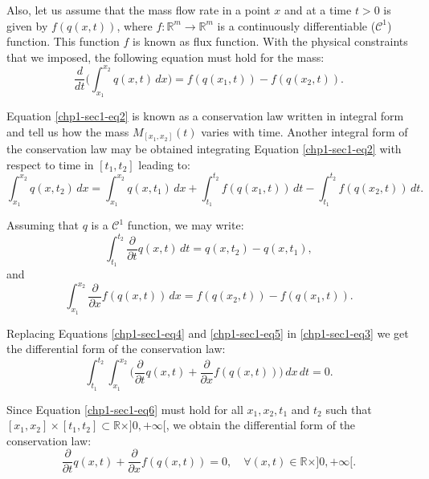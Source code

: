 Also, let us assume that the mass flow rate in a point $x$ and at a time 
$t > 0$ is given by ${f}({q}(x,t))$, where ${f}:\mathbb{R}^m \to \mathbb{R}^m$ is 
a continuously differentiable ($\mathcal{C}^1$) function. This function ${f}$ is known as flux function.
With the physical constraints that we imposed, the following equation must hold for the mass:
\begin{equation}
	\label{chp1-sec1-eq2}
	\frac{d}{dt} \bigg( \int_{x_1}^{x_2} {q}(x,t) \,dx \bigg) = 
	{f}({q}(x_1,t)) - {f}({q}(x_2,t)) .
\end{equation}

Equation \eqref{chp1-sec1-eq2} is known as a conservation law written in integral form and tell us how the mass 
${M}_{[x_1, x_2]}(t)$ varies with time. Another integral form of the conservation law may be obtained integrating
Equation \eqref{chp1-sec1-eq2} with respect to time in $[t_1, t_2]$ leading to: 
\begin{equation}
	\label{chp1-sec1-eq3}
	\int_{x_1}^{x_2} {q}(x, t_2) \,dx = 
	\int_{x_1}^{x_2} {q}(x, t_1) \,dx + 
	\int_{t_1}^{t_2} {f}({q}(x_1, t)) \,dt -
	\int_{t_1}^{t_2}{f}({q}(x_2, t)) \,dt .
\end{equation}

Assuming that ${q}$ is a $\mathcal{C}^1$ function, we may write:
\begin{equation}
	\label{chp1-sec1-eq4}
	\int_{t_1}^{t_2} 
	\frac{\partial}{\partial t} {q}(x,t) \,dt
	= {q}(x, t_2) - {q}(x, t_1) ,
\end{equation}
and
\begin{equation}
	\label{chp1-sec1-eq5}
	\int_{x_1}^{x_2} \frac{\partial}{\partial x}{f}({q}(x,t)) \,dx 
	= {f}({q}(x_2, t)) -
	{f}( {q}(x_1, t)) .
\end{equation}

Replacing Equations \eqref{chp1-sec1-eq4} and \eqref{chp1-sec1-eq5}
in \eqref{chp1-sec1-eq3} we get the differential form of the conservation law:
\begin{equation}
	\label{chp1-sec1-eq6}
	\int_{t_1}^{t_2} \int_{x_1}^{x_2} 
	\bigg( \frac{\partial}{\partial t}{q}(x, t) 
	+ \frac{\partial}{\partial x} {f}({q}(x, t)) \bigg) 
	\,dx \,dt  = 0.
\end{equation}

Since Equation \eqref{chp1-sec1-eq6} must hold for all $x_1, x_2, t_1$ and $t_2$ such that
$[x_1, x_2] \times [t_1, t_2] \subset \mathbb{R}\times ]0, +\infty[$, we obtain the differential form of the conservation law:
\begin{equation}
	\label{chp1-sec1-eq7}
	\frac{\partial}{\partial t}{q}(x, t) +
	\frac{\partial}{\partial x} {f}({q}(x, t))
	= 0, \quad \forall (x,t) \in \mathbb{R}\times ]0, +\infty[. 
\end{equation}

